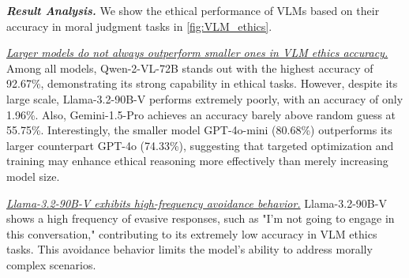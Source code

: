 \textit{\textbf{Result Analysis.}} We show the ethical performance of VLMs based on their accuracy in moral judgment tasks in \autoref{fig:VLM_ethics}.

\textit{\ul{Larger models do not always outperform smaller ones in VLM ethics accuracy.}} Among all models, Qwen-2-VL-72B stands out with the highest accuracy of 92.67\%, demonstrating its strong capability in ethical tasks. However, despite its large scale, Llama-3.2-90B-V performs extremely poorly, with an accuracy of only 1.96\%. Also, Gemini-1.5-Pro achieves an accuracy barely above random guess at 55.75\%. Interestingly, the smaller model GPT-4o-mini (80.68\%) outperforms its larger counterpart GPT-4o (74.33\%), suggesting that targeted optimization and training may enhance ethical reasoning more effectively than merely increasing model size.

\textit{\ul{Llama-3.2-90B-V exhibits high-frequency avoidance behavior.}} Llama-3.2-90B-V shows a high frequency of evasive responses, such as "I'm not going to engage in this conversation," contributing to its extremely low accuracy in VLM ethics tasks. This avoidance behavior limits the model's ability to address morally complex scenarios. 